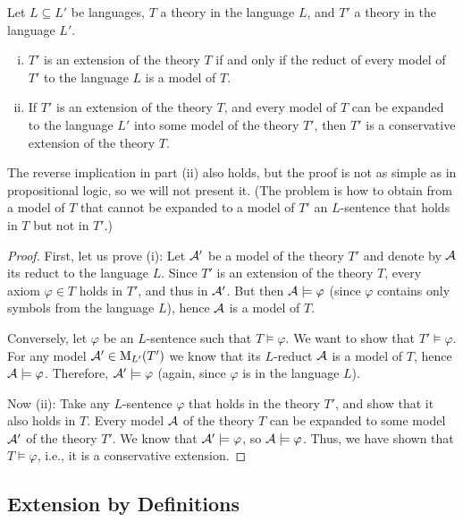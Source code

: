 \begin{proposition}\label{proposition:semantic-conditions-for-extensions}
    Let $L\subseteq L'$ be languages, $T$ a theory in the language $L$, and $T'$ a theory in the language $L'$.
    \begin{enumerate}[(i)]
        \item $T'$ is an extension of the theory $T$ if and only if the reduct of every model of $T'$ to the language $L$ is a model of $T$.
        \item If $T'$ is an extension of the theory $T$, and every model of $T$ can be expanded to the language $L'$ into some model of the theory $T'$, then $T'$ is a conservative extension of the theory $T$.
    \end{enumerate}
\end{proposition}
\begin{remark}
    The reverse implication in part (ii) also holds, but the proof is not as simple as in propositional logic, so we will not present it. (The problem is how to obtain from a model of $T$ that cannot be expanded to a model of $T'$ an $L$-sentence that holds in $T$ but not in $T'$.)
\end{remark}
\begin{proof}
    First, let us prove (i): Let $\mathcal{A}'$ be a model of the theory $T'$ and denote by $\mathcal{A}$ its reduct to the language $L$. Since $T'$ is an extension of the theory $T$, every axiom $\varphi\in T$ holds in $T'$, and thus in $\mathcal{A}'$. But then $\mathcal{A}\models\varphi$ (since $\varphi$ contains only symbols from the language $L$), hence $\mathcal{A}$ is a model of $T$.

    Conversely, let $\varphi$ be an $L$-sentence such that $T\models\varphi$. We want to show that $T'\models\varphi$. For any model $\mathcal{A}'\in\operatorname{M}_{L'}(T')$ we know that its $L$-reduct $\mathcal{A}$ is a model of $T$, hence $\mathcal{A}\models\varphi$. Therefore, $\mathcal{A}'\models\varphi$ (again, since $\varphi$ is in the language $L$).

    Now (ii): Take any $L$-sentence $\varphi$ that holds in the theory $T'$, and show that it also holds in $T$. Every model $\mathcal{A}$ of the theory $T$ can be expanded to some model $\mathcal{A}'$ of the theory $T'$. We know that $\mathcal{A}'\models\varphi$, so $\mathcal{A}\models\varphi$. Thus, we have shown that $T\models\varphi$, i.e., it is a conservative extension.
\end{proof}


\subsection{Extension by Definitions}\label{subsection:extension-by-definition}

